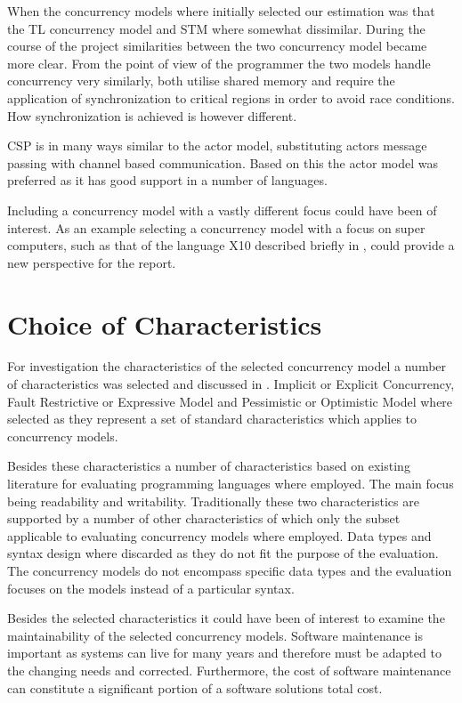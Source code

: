 When the concurrency models where initially selected our estimation was that the \ac{TL} concurrency model and \ac{STM} where somewhat dissimilar. During the course of the project similarities between the two concurrency model became more clear. From the point of view of the programmer the two models handle concurrency very similarly, both utilise shared memory and require the application of synchronization to critical regions in order to avoid race conditions. How synchronization is achieved is however different.

\ac{CSP} is in many ways similar to the actor model, substituting actors message passing with channel based communication. Based on this the actor model was preferred as it has good support in a number of languages.

Including a concurrency model with a vastly different focus could have been of interest. As an example selecting a concurrency model with a focus on super computers, such as that of the language X10\cite{tardieu2014x10} described briefly in , could provide a new perspective for the report.

\section{Choice of Characteristics}
For investigation the characteristics of the selected concurrency model a number of characteristics was selected and discussed in . Implicit or Explicit Concurrency, Fault Restrictive or Expressive Model and Pessimistic or Optimistic Model where selected as they represent a set of standard characteristics which applies to concurrency models.

Besides these characteristics a number of characteristics based on existing literature for evaluating programming languages where employed. The main focus being readability and writability. Traditionally these two characteristics are supported by a number of other characteristics of which only the subset applicable to evaluating concurrency models where employed. Data types and syntax design where discarded as they do not fit the purpose of the evaluation. The concurrency models do not encompass specific data types and the evaluation focuses on the models instead of a particular syntax.

Besides the selected characteristics it could have been of interest to examine the maintainability of the selected concurrency models. Software maintenance is important as systems can live for many years and therefore must be adapted to the changing needs and corrected. Furthermore, the cost of software maintenance can constitute a significant portion of a software solutions total cost\cite[p. 17]{sebestaProLang}.

